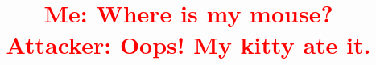 

\newif\ifpaper
\papertrue


\newif\ifdesperatetime

\graphicspath{{images/}}


\title{\textcolor{red}{Me: Where is my mouse?\\
Attacker: Oops! My kitty ate it.}}

\iffalse
\author{\IEEEauthorblockN{Aritra Dhar}
\IEEEauthorblockA{ETH Z{\"u}rich\\
aritra.dhar@inf.ethz.ch}
}
\fi
\maketitle
\begin{abstract}

\end{abstract}

\IEEEpeerreviewmaketitle







%  
%


